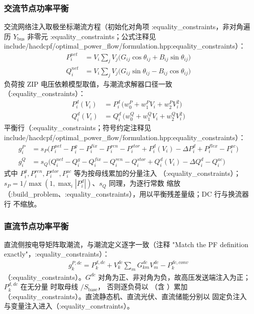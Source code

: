 \subsubsection*{交流节点功率平衡}
交流网络注入取极坐标潮流方程（初始化对角项 :equality\_constraints，非对角遍历
$Y_{\mathrm{bus}}$ 非零元 :equality\_constraints；公式注释见
include/hacdcpf/optimal\_power\_flow/formulation.hpp:equality\_constraints）：
\begin{align*}
P^{net}_i&=V_i\sum_{j}V_j\big(G_{ij}\cos\theta_{ij}+B_{ij}\sin\theta_{ij}\big)\\
Q^{net}_i&=V_i\sum_{j}V_j\big(G_{ij}\sin\theta_{ij}-B_{ij}\cos\theta_{ij}\big)
\end{align*}
负荷按 ZIP 电压依赖模型取值，与潮流求解器口径一致（:equality\_constraints）：
\begin{align*}
P^d_i(V_i)&=P^d_i\,\big(w^{P}_0+w^{P}_1 V_i+w^{P}_2 V_i^2\big)\\
Q^d_i(V_i)&=Q^d_i\,\big(w^{Q}_0+w^{Q}_1 V_i+w^{Q}_2 V_i^2\big)
\end{align*}
平衡行（:equality\_constraints；符号约定注释见 include/hacdcpf/optimal\_power\_flow/formulation.hpp:equality\_constraints）：
\begin{align*}
g^P_i&=s_P\Big(P^{net}_i-P^g_i-P^{fix}_i-P^{ren}_i-P^{stor}_i
      +P^d_i(V_i)-\Delta P^d_i+P^{flex}_i-P^{ac}_i\Big)\\
g^Q_i&=s_Q\Big(Q^{net}_i-Q^g_i-Q^{fix}_i-Q^{ren}_i-Q^{stor}_i
      +Q^d_i(V_i)-\Delta Q^d_i-Q^{ac}_i\Big)
\end{align*}
式中 $P^g_i,P^{ren}_i,P^{stor}_i,P^{ac}_i$ 等为按母线累加的分量注入
（:equality\_constraints）；$s_P=1/\max(1,\max_i|P^d_i|)$、$s_Q$ 同理，为逐行常数
缩放（:build\_problem、:equality\_constraints），用以平衡残差量级；DC 行与换流器行
不缩放。

\subsubsection*{直流节点功率平衡}
直流侧按电导矩阵取潮流，与潮流定义逐字一致（注释
"Match the PF definition exactly"，:equality\_constraints）：
\begin{align*}
g^{P,dc}_k=P^{d,dc}_k+V^{dc}_k\sum_{m}G^{dc}_{km}V^{dc}_m-P^{dc,conv}_k
\end{align*}
（:equality\_constraints）。$G^{dc}$ 对角为正、非对角为负，故高压发送端注入为正；
$P^{d,dc}_k$ 在无分量  时取母线 $/S_{\mathrm{base}}$，
否则逐负荷以 （含 ）累加
（:equality\_constraints）。直流静态机、直流光伏、直流储能分别以
固定负注入与变量注入进入（:equality\_constraints）。

